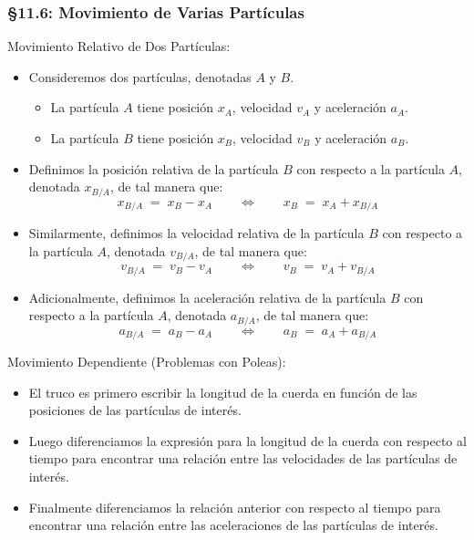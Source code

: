 \documentclass[ 10pt, xcolor = dvipsnames]{beamer}
\newcommand{\fullskip}{\vspace{\baselineskip}}
\begin{document}
\begin{frame}[allowframebreaks]
\frametitle{\S 11.6: Movimiento de Varias Part\'iculas}

Movimiento Relativo de Dos Part\'iculas: 
\begin{itemize}
\item Consideremos dos part\'iculas, denotadas $A$ y $B$. 
\begin{itemize}
\item La part\'icula $A$ tiene posici\'on $x_A$, velocidad $v_A$ y aceleraci\'on $a_A$. 
\item La part\'icula $B$ tiene posici\'on $x_B$, velocidad $v_B$ y aceleraci\'on $a_B$. 
\end{itemize}
\item Definimos la posici\'on relativa de la part\'icula $B$ con respecto a la part\'icula $A$, denotada $x_{B/A}$, de tal manera que: 
\[
x_{B/A} \; = \; x_B - x_A \qquad \Longleftrightarrow \qquad
x_B \; = \; x_A + x_{B/A}
\]
\item Similarmente, definimos la velocidad relativa de la part\'icula $B$ con respecto \linebreak a la part\'icula $A$, denotada $v_{B/A}$, de tal manera que: 
\[
v_{B/A} \; = \; v_B - v_A \qquad \Longleftrightarrow \qquad
v_B \; = \; v_A + v_{B/A}
\]
\item Adicionalmente, definimos la aceleraci\'on relativa de la part\'icula $B$ con respecto a la part\'icula $A$, denotada $a_{B/A}$, de tal manera que: 
\[
a_{B/A} \; = \; a_B - a_A \qquad \Longleftrightarrow \qquad
a_B \; = \; a_A + a_{B/A}
\]
\end{itemize}
\fullskip

Movimiento Dependiente (Problemas con Poleas): 
\begin{itemize}
\item El truco es primero escribir la longitud de la cuerda en funci\'on de las posiciones de las part\'iculas de inter\'es. 
\item Luego diferenciamos la expresi\'on para la longitud de la cuerda con respecto \linebreak al tiempo para encontrar una relaci\'on entre las velocidades de las part\'iculas de inter\'es. 
\item Finalmente diferenciamos la relaci\'on anterior con respecto al tiempo para encontrar una relaci\'on entre las aceleraciones de las part\'iculas de inter\'es. 
\end{itemize}

\end{frame}
\end{document}
